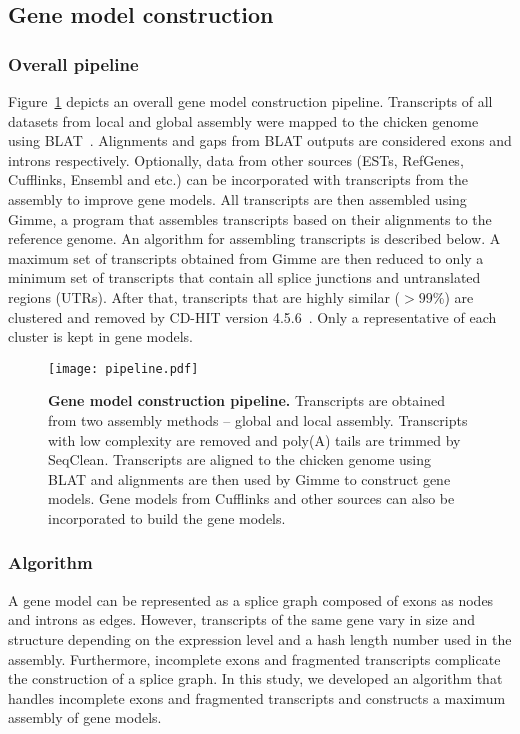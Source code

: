 \subsection{Gene model construction}
\subsubsection{Overall pipeline}

Figure~\ref{pipeline} depicts an overall gene model
construction pipeline.  Transcripts of all datasets from local
and global assembly were mapped to the chicken genome using
BLAT~\cite{Kent:2002tv}.  Alignments and gaps from BLAT outputs
are considered exons and introns respectively.  Optionally, data
from other sources (ESTs, RefGenes, Cufflinks, Ensembl and etc.)
can be incorporated with transcripts from the assembly to improve
gene models.  All transcripts are then assembled using Gimme, a
program that assembles transcripts based on their alignments to
the reference genome.  An algorithm for assembling transcripts is
described below.  A maximum set of transcripts obtained from
Gimme are then reduced to only a minimum set of transcripts that
contain all splice junctions and untranslated regions (UTRs).
After that, transcripts that are highly similar ($>99\%$) are
clustered and removed by CD-HIT version 4.5.6~\cite{Li:2006hr}.
Only a representative of each cluster is kept in gene models.

\begin{figure}[!ht]
\begin{center}
\texttt{[image: pipeline.pdf]}
\end{center}
\caption{
\textbf{Gene model construction pipeline.}
Transcripts are obtained from two assembly methods -- global and
local assembly. Transcripts with low complexity are removed and
poly(A) tails are trimmed by SeqClean. Transcripts are aligned to
the chicken genome using BLAT and alignments are then used by
Gimme to construct gene models. Gene models from Cufflinks and
other sources can also be incorporated to build the gene models.
}
\label{pipeline}
\end{figure}

\subsubsection{Algorithm}

A gene model can be represented as a splice graph composed of exons as nodes and
introns as edges.  However, transcripts of the same gene vary in size and
structure depending on the expression level and a hash length number used in
the assembly.  Furthermore, incomplete exons and fragmented transcripts complicate
the construction of a splice graph.  In this study, we developed an algorithm
that handles incomplete exons and fragmented transcripts and constructs a
maximum assembly of gene models.

